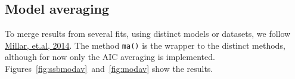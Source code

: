 \documentclass[a4paper,english,10pt]{article}\usepackage[]{graphicx}\usepackage[]{color}
\newcommand{\code}[1]{{\texttt{#1}}}
\begin{document}





\subsection{Model averaging}

To merge results from several fits, using distinct models or datasets, we follow \href{http://icesjms.oxfordjournals.org/content/early/2014/03/31/icesjms.fsu043.abstract}{Millar, et.al, 2014}. The method \code{ma()} is the wrapper to the distinct methods, although for now only the AIC averaging is implemented. Figures~\ref{fig:ssbmodav}~and~\ref{fig:modav} show the results. 
\end{document}

